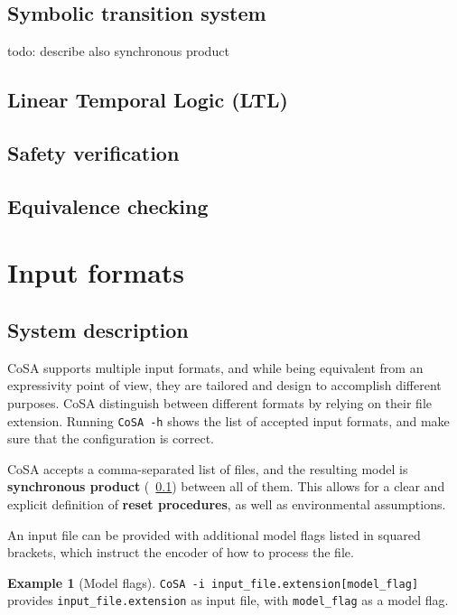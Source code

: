 \documentclass{article}
\theoremstyle{definition}
\newtheorem{example}{Example}[section]
\begin{document}
\subsection{Symbolic transition system}
\label{sec:sts}

todo: describe also synchronous product


\subsection{Linear Temporal Logic (LTL)}
\label{sec:ltl}

\subsection{Safety verification}
\label{sec:safety}

\subsection{Equivalence checking}
\label{sec:equivalence}


\section{Input formats}
\label{sec:input_formats}

\subsection{System description}

CoSA supports multiple input formats, and while being equivalent from
an expressivity point of view, they are tailored and design to
accomplish different purposes. CoSA distinguish between different
formats by relying on their file extension. Running \texttt{CoSA -h}
shows the list of accepted input formats, and make sure that the
configuration is correct.

CoSA accepts a comma-separated list of files, and the resulting model
is \textbf{synchronous product} (\textsection~\ref{sec:sts}) between
all of them. This allows for a clear and explicit definition of
\textbf{reset procedures}, as well as environmental assumptions.

An input file can be provided with additional model flags listed in
squared brackets, which instruct the encoder of how to process the
file.

\begin{example}[Model flags]
   \texttt{CoSA -i input\_file.extension[model\_flag]} provides
   \texttt{input\_file.extension} as input file, with
   \texttt{model\_flag} as a model flag.
\end{example}
\end{document}
